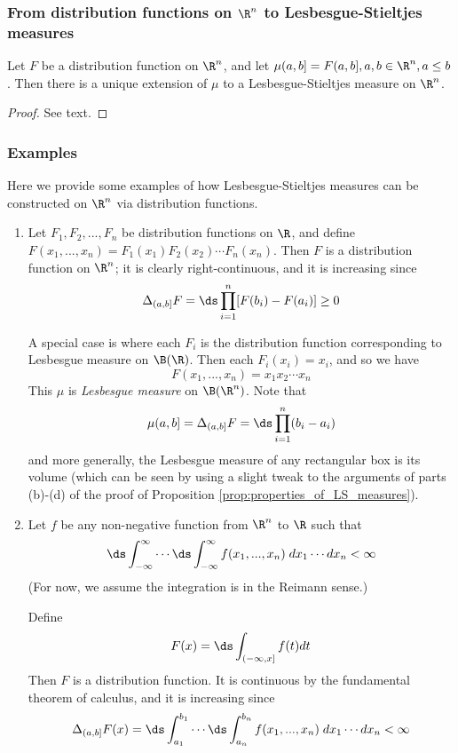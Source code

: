\documentclass{article} %
\begin{document}
 \subsubsection{From distribution functions on $\R^n$ to Lesbesgue-Stieltjes measures}
 
 \begin{theorem}
 Let $F$ be a distribution function on $\R^n$, and let $\mu(a,b] = F(a,b], a,b \in \R^n, a \leq b$. Then there is a unique extension of $\mu$ to a Lesbesgue-Stieltjes measure on $\R^n$.	
 \end{theorem}
 
 \begin{proof}
 See text. 	
 \end{proof}

\subsubsection{Examples}

Here we provide some examples of how Lesbesgue-Stieltjes measures can be constructed on $\R^n$ via distribution functions.

\begin{enumerate}
\item Let $F_1,F_2,...,F_n$ be distribution functions on $\R$, and define $F(x_1,...,x_n) = F_1(x_1) F_2(x_2) \cdots F_n(x_n)$.  Then $F$ is a distribution function on $\R^n$; it is clearly right-continuous, and it is increasing since
\[ \Delta_{(a,b]} F =\ds\prod_{i=1}^n [F(b_i) - F(a_i)] \geq 0 \]
	
A special case is where each $F_i$ is the distribution function corresponding to Lesbesgue measure on $\B(\R)$.  Then each $F_i(x_i) = x_i$, and so we have
\[ F(x_1,...,x_n) = x_1x_2 \cdots x_n\]
This $\mu$ is \textit{Lesbesgue measure} on $\B(\R^n)$.  Note that 
\[ \mu(a,b] = \Delta_{(a,b]} F = \ds\prod_{i=1}^n (b_i-a_i) \]
and more generally, the Lesbesgue measure of any rectangular box is its volume (which can be seen by using a slight tweak to the arguments of parts (b)-(d) of the proof of Proposition \ref{prop:properties_of_LS_measures}). 
\item Let $f$ be any non-negative function from $\R^n$ to $\R$ such that 
\[ \ds\int_{-\infty}^\infty \cdots  \ds\int_{-\infty}^\infty f(x_1,...,x_n) \; dx_1 \cdots dx_n < \infty \]
(For now, we assume the integration is in the Reimann sense.)

Define 
\[ F(x) = \ds\int_{(-\infty,x]} f(t) dt \]
Then $F$ is a distribution function. It is continuous by the fundamental theorem of calculus, and it is increasing since
\[ \Delta_{(a,b]} F(x) = \ds\int_{a_1}^{b_1} \cdots  \ds\int_{a_n}^{b_n} f(x_1,...,x_n) \; dx_1 \cdots dx_n < \infty \]  
\end{enumerate}
\end{document}
